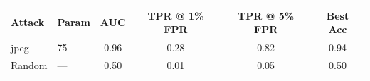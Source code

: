 \begin{tabular}{llcccc}
\toprule
Attack & Param & AUC & TPR @ 1\% FPR & TPR @ 5\% FPR & Best Acc \\
\midrule
jpeg & 75 & 0.96 & 0.28 & 0.82 & 0.94 \\
Random & — & 0.50 & 0.01 & 0.05 & 0.50 \\
\bottomrule
\end{tabular}
